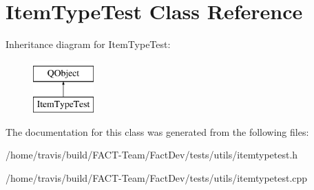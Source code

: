 \hypertarget{classItemTypeTest}{\section{Item\-Type\-Test Class Reference}
\label{classItemTypeTest}
}
Inheritance diagram for Item\-Type\-Test\-:\begin{figure}[H]
\begin{center}
\leavevmode
\includegraphics[height=2.000000cm]{d3/de2/classItemTypeTest}
\end{center}
\end{figure}


The documentation for this class was generated from the following files\-:\begin{DoxyCompactItemize}
\item 
/home/travis/build/\-F\-A\-C\-T-\/\-Team/\-Fact\-Dev/tests/utils/itemtypetest.\-h\item 
/home/travis/build/\-F\-A\-C\-T-\/\-Team/\-Fact\-Dev/tests/utils/itemtypetest.\-cpp\end{DoxyCompactItemize}
